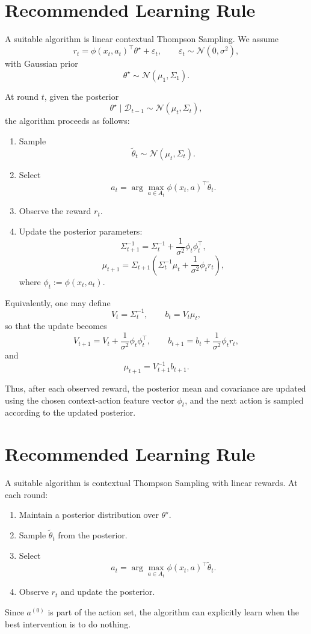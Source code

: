 \documentclass[11pt,a4paper]{article}
\begin{document}
\section{Recommended Learning Rule}

A suitable algorithm is linear contextual Thompson Sampling. We assume
\[
r_t = \phi(x_t,a_t)^\top \theta^\star + \varepsilon_t,
\qquad
\varepsilon_t \sim \mathcal{N}(0,\sigma^2),
\]
with Gaussian prior
\[
\theta^\star \sim \mathcal{N}(\mu_1,\Sigma_1).
\]

At round \(t\), given the posterior
\[
\theta^\star \mid \mathcal{D}_{t-1} \sim \mathcal{N}(\mu_t,\Sigma_t),
\]
the algorithm proceeds as follows:

\begin{enumerate}[label=\arabic*.]
    \item Sample
    \[
    \tilde{\theta}_t \sim \mathcal{N}(\mu_t,\Sigma_t).
    \]
    \item Select
    \[
    a_t
    =
    \arg\max_{a \in A_t}
    \phi(x_t,a)^\top \tilde{\theta}_t.
    \]
    \item Observe the reward \(r_t\).
    \item Update the posterior parameters:
    \[
    \Sigma_{t+1}^{-1}
    =
    \Sigma_t^{-1}
    +
    \frac{1}{\sigma^2}\phi_t\phi_t^\top,
    \]
    \[
    \mu_{t+1}
    =
    \Sigma_{t+1}
    \left(
    \Sigma_t^{-1}\mu_t
    +
    \frac{1}{\sigma^2}\phi_t r_t
    \right),
    \]
    where \(\phi_t := \phi(x_t,a_t)\).
\end{enumerate}

Equivalently, one may define
\[
V_t = \Sigma_t^{-1},
\qquad
b_t = V_t \mu_t,
\]
so that the update becomes
\[
V_{t+1} = V_t + \frac{1}{\sigma^2}\phi_t\phi_t^\top,
\qquad
b_{t+1} = b_t + \frac{1}{\sigma^2}\phi_t r_t,
\]
and
\[
\mu_{t+1} = V_{t+1}^{-1} b_{t+1}.
\]

Thus, after each observed reward, the posterior mean and covariance are
updated using the chosen context-action feature vector \(\phi_t\), and the
next action is sampled according to the updated posterior.

\section{Recommended Learning Rule}

A suitable algorithm is contextual Thompson Sampling with linear rewards.
At each round:

\begin{enumerate}[label=\arabic*.]
    \item Maintain a posterior distribution over \(\theta^\star\).
    \item Sample \(\tilde{\theta}_t\) from the posterior.
    \item Select
    \[
    a_t
    =
    \arg\max_{a \in A_t}
    \phi(x_t,a)^\top \tilde{\theta}_t.
    \]
    \item Observe \(r_t\) and update the posterior.
\end{enumerate}

Since \(a^{(0)}\) is part of the action set, the algorithm can explicitly learn when the best intervention is to do nothing.
\end{document}
